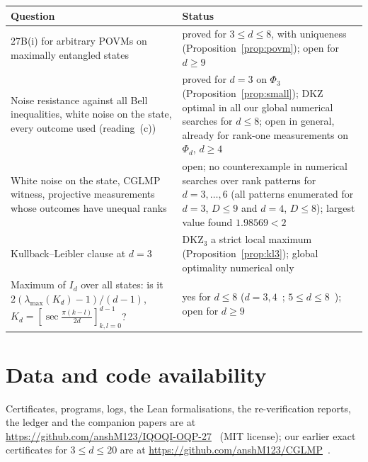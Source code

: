 \documentclass[11pt]{article}
\theoremstyle{remark}
\numberwithin{equation}{section}
\newcommand{\DKZ}{\mathrm{DKZ}}
\begin{document}
\begin{center}\footnotesize
{}\label{tab:openq}
\begin{tabular}{@{}>{\raggedright\arraybackslash}p{}>{\raggedright\arraybackslash}p{}@{}}
\toprule
Question & Status\\
\midrule
27B(i) for arbitrary POVMs on maximally entangled states & proved for $3\le d\le8$, with uniqueness
(Proposition~\ref{prop:povm}); open for $d\ge9$\\
Noise resistance against all Bell inequalities, white noise on the state, every outcome used (reading~(c)) & proved for
$d=3$ on $\Phi_3$ (Proposition~\ref{prop:small}); DKZ optimal in all our global numerical searches for $d\le8$; open in
general, already for rank-one measurements on $\Phi_d$, $d\ge4$\\
White noise on the state, CGLMP witness, projective measurements whose outcomes have unequal ranks & open; no
counterexample in numerical searches over rank patterns for $d=3,\dots,6$ (all patterns enumerated for $d=3$, $D\le9$ and
$d=4$, $D\le8$); largest value found $1.98569<2$\\
Kullback--Leibler clause at $d=3$ & $\DKZ_3$ a strict local maximum (Proposition~\ref{prop:kl3}); global optimality
numerical only\\
Maximum of $I_d$ over all states: is it $2(\lambda_{\max}(K_d)-1)/(d-1)$, $K_d=[\sec\frac{\pi(k-l)}{2d}]_{k,l=0}^{d-1}$? &
yes for $d\le8$ ($d=3,4$~\cite{IR}; $5\le d\le8$~\cite{repoCGLMP}); open for $d\ge9$\\
\bottomrule
\end{tabular}
\end{center}

\section*{Data and code availability}
Certificates, programs, logs, the Lean formalisations, the re-verification reports, the ledger and the companion
papers are at \url{https://github.com/anshM123/IQOQI-OQP-27}~\cite{repo} (MIT license); our
earlier exact certificates for $3\le d\le20$ are at \url{https://github.com/anshM123/CGLMP}~\cite{repoCGLMP}.
\end{document}
